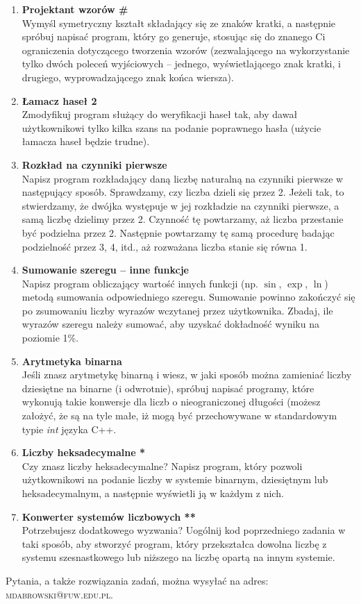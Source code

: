 \documentclass[12pt]{article}
\begin{document}
\begin{enumerate}
\newpage
{}

\item \textbf{Projektant wzorów \#}\\
Wymyśl symetryczny kształt składający się ze znaków kratki, a następnie spróbuj napisać program, który go generuje, stosując się do znanego Ci ograniczenia dotyczącego tworzenia wzorów (zezwalającego na wykorzystanie tylko dwóch poleceń wyjściowych -- jednego, wyświetlającego znak kratki, i drugiego, wyprowadzającego znak końca wiersza).

\item \textbf{Łamacz haseł 2}\\
Zmodyfikuj program służący do weryfikacji haseł tak, aby dawał użytkownikowi tylko kilka szans na podanie poprawnego hasła (użycie łamacza haseł będzie trudne).

\item \textbf{Rozkład na czynniki pierwsze}\\
Napisz program rozkładający daną liczbę naturalną na czynniki pierwsze w następujący sposób. Sprawdzamy, czy liczba dzieli się przez 2. Jeżeli tak, to stwierdzamy, że dwójka występuje w jej rozkładzie na czynniki pierwsze, a samą liczbę dzielimy przez 2. Czynność tę powtarzamy, aż liczba przestanie być podzielna przez 2. Następnie powtarzamy tę samą procedurę badając podzielność przez 3, 4, itd., aż rozważana liczba stanie się równa 1.

\item \textbf{Sumowanie szeregu -- inne funkcje}\\
Napisz program obliczający wartość innych funkcji (np. $\sin$, $\exp$, $\ln$) metodą sumowania odpowiedniego szeregu. Sumowanie powinno zakończyć się po zsumowaniu liczby wyrazów wczytanej przez użytkownika. Zbadaj, ile wyrazów szeregu należy sumować, aby uzyskać dokładność wyniku na poziomie 1\%.

\item \textbf{Arytmetyka binarna}\\
Jeśli znasz arytmetykę binarną i wiesz, w jaki sposób można zamieniać liczby dziesiętne na binarne (i odwrotnie), spróbuj napisać programy, które wykonują takie konwersje dla liczb o nieograniczonej długości (możesz założyć, że są na tyle małe, iż mogą być przechowywane w standardowym typie \textit{int} języka C++.

\item \textbf{Liczby heksadecymalne *}\\
Czy znasz liczby heksadecymalne? Napisz program, który pozwoli użytkownikowi na podanie liczby w systemie binarnym, dziesiętnym lub heksadecymalnym, a następnie wyświetli ją w każdym z nich.

\item \textbf{Konwerter systemów liczbowych **}\\
Potrzebujesz dodatkowego wyzwania? Uogólnij kod poprzedniego zadania w taki sposób, aby stworzyć program, który przekształca dowolna liczbę z systemu szesnastkowego lub niższego na liczbę opartą na innym systemie.


\end{enumerate}
\vspace{1cm}
\small Pytania, a także rozwiązania zadań, można wysyłać na adres: \textsc{mdabrowski@fuw.edu.pl}.
\end{document}
